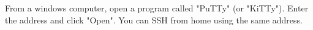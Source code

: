 
From a windows computer, open a program called "PuTTy" (or "KiTTy"). Enter the address  and click "Open". You can SSH from home using the same address. %








